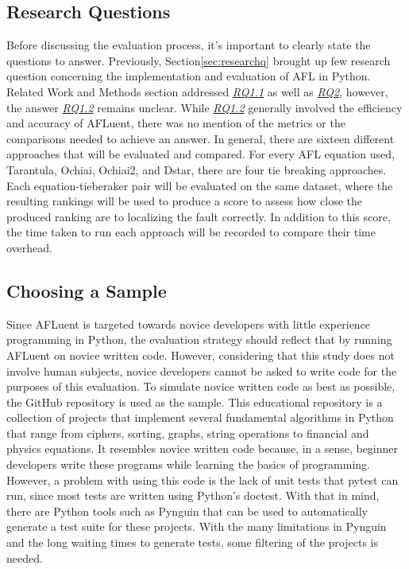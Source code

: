 \subsection{Research Questions}
\label{subsec:research_questions_eval}

Before discussing the evaluation process, it's important to clearly state the
questions to answer. Previously, Section\ref{sec:researchq} brought up few
research question concerning the implementation and evaluation of AFL in Python.
Related Work and Methods section addressed \hyperref[para:RQ1.1]{\emph{RQ1.1}} as well as
\hyperref[para:RQ2]{\emph{RQ2}}, however, the answer \hyperref[para:RQ1.2]{\emph{RQ1.2}} remains unclear. While \hyperref[para:RQ1.2]{\emph{RQ1.2}}
generally involved the efficiency and accuracy of AFLuent, there was no mention
of the metrics or the comparisons needed to achieve an answer. In general, there
are sixteen different approaches that will be evaluated and compared. For every AFL
equation used, Tarantula, Ochiai, Ochiai2, and Dstar, there are four tie breaking
approaches. Each equation-tieberaker pair will be evaluated on the same dataset,
where the resulting rankings will be used to produce a score to assess how
close the produced ranking are to localizing the fault correctly. In addition to
this score, the time taken to run each approach will be recorded to compare
their time overhead.

\subsection{Choosing a Sample}
\label{subsec:choosing_sample}

Since AFLuent is targeted towards novice developers with little experience
programming in Python, the evaluation strategy should reflect that by running
AFLuent on novice written code. However, considering that this study does not
involve human subjects, novice developers cannot be asked to write code for the
purposes of this evaluation. To simulate novice written code as best as
possible, the GitHub repository \cite{the_algorithms_python}
is used as the sample. This educational repository is a collection of projects
that implement several fundamental algorithms in Python that range from ciphers,
sorting, graphs, string operations to financial and physics equations.
It resembles novice written
code because, in a sense, beginner developers write these programs while
learning the basics of programming. However, a problem
with using this code is the lack of unit tests that pytest can run, since most
tests are written using Python's doctest. With that in mind, there are Python
tools such as Pynguin\cite{Lukasczyk_Pynguin_Automated_Unit_2022}
that can be used to automatically generate a test suite for these projects.
With the many limitations in Pynguin and the long waiting times to generate
tests, some filtering of the projects is needed.



